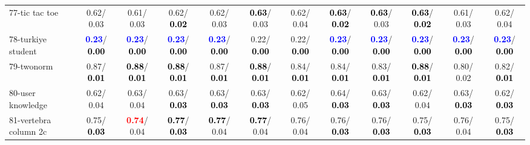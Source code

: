 \begin{table}[h]
\begin{center}
{\begin{tabular}{lc|c|c|c|c|c|c|c|c|c|c}
77-tic tac toe &   0.62/  0.03 &   0.61/  0.03 &   0.62/\textcolor{black}{\textbf{  0.02}} &   0.62/  0.03 & \textcolor{black}{\textbf{  0.63}}/  0.03 &   0.62/  0.04 & \textcolor{black}{\textbf{  0.63}}/\textcolor{black}{\textbf{  0.02}} & \textcolor{black}{\textbf{  0.63}}/  0.03 & \textcolor{black}{\textbf{  0.63}}/\textcolor{black}{\textbf{  0.02}} &   0.61/  0.03 &   0.62/  0.04 \\
78-turkiye student & \textcolor{blue}{\textbf{  0.23}}/\textcolor{black}{\textbf{  0.00}} & \textcolor{blue}{\textbf{  0.23}}/\textcolor{black}{\textbf{  0.00}} & \textcolor{blue}{\textbf{  0.23}}/\textcolor{black}{\textbf{  0.00}} & \textcolor{blue}{\textbf{  0.23}}/\textcolor{black}{\textbf{  0.00}} &   0.22/\textcolor{black}{\textbf{  0.00}} &   0.22/\textcolor{black}{\textbf{  0.00}} & \textcolor{blue}{\textbf{  0.23}}/\textcolor{black}{\textbf{  0.00}} & \textcolor{blue}{\textbf{  0.23}}/\textcolor{black}{\textbf{  0.00}} & \textcolor{blue}{\textbf{  0.23}}/\textcolor{black}{\textbf{  0.00}} & \textcolor{blue}{\textbf{  0.23}}/\textcolor{black}{\textbf{  0.00}} & \textcolor{blue}{\textbf{  0.23}}/\textcolor{black}{\textbf{  0.00}} \\ \hline
79-twonorm &   0.87/\textcolor{black}{\textbf{  0.01}} & \textcolor{black}{\textbf{  0.88}}/\textcolor{black}{\textbf{  0.01}} & \textcolor{black}{\textbf{  0.88}}/\textcolor{black}{\textbf{  0.01}} &   0.87/\textcolor{black}{\textbf{  0.01}} & \textcolor{black}{\textbf{  0.88}}/\textcolor{black}{\textbf{  0.01}} &   0.84/\textcolor{black}{\textbf{  0.01}} &   0.84/\textcolor{black}{\textbf{  0.01}} &   0.83/\textcolor{black}{\textbf{  0.01}} & \textcolor{black}{\textbf{  0.88}}/\textcolor{black}{\textbf{  0.01}} &   0.80/  0.02 &   0.82/\textcolor{black}{\textbf{  0.01}} \\
80-user knowledge &   0.62/  0.04 &   0.63/  0.04 &   0.63/\textcolor{black}{\textbf{  0.03}} &   0.63/\textcolor{black}{\textbf{  0.03}} &   0.63/\textcolor{black}{\textbf{  0.03}} &   0.62/  0.05 &   0.64/\textcolor{black}{\textbf{  0.03}} &   0.63/\textcolor{black}{\textbf{  0.03}} &   0.62/  0.04 &   0.63/\textcolor{black}{\textbf{  0.03}} &   0.62/\textcolor{black}{\textbf{  0.03}} \\
81-vertebra column 2c &   0.75/\textcolor{black}{\textbf{  0.03}} & \textcolor{red}{\textbf{  0.74}}/  0.04 & \textcolor{black}{\textbf{  0.77}}/\textcolor{black}{\textbf{  0.03}} & \textcolor{black}{\textbf{  0.77}}/  0.04 & \textcolor{black}{\textbf{  0.77}}/  0.04 &   0.76/  0.04 &   0.76/\textcolor{black}{\textbf{  0.03}} &   0.76/\textcolor{black}{\textbf{  0.03}} &   0.75/\textcolor{black}{\textbf{  0.03}} &   0.76/  0.04 &   0.75/\textcolor{black}{\textbf{  0.03}} \\

\end{tabular}}
\end{center}
\end{table}
